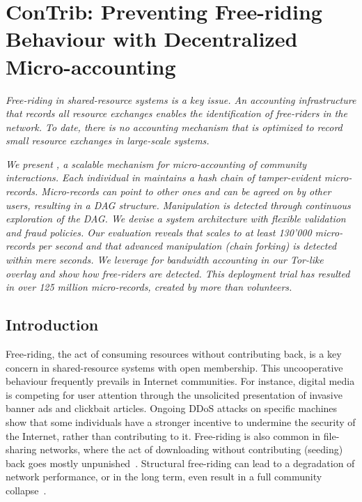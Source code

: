\chapter{ConTrib: Preventing Free-riding Behaviour with Decentralized Micro-accounting}
\label{chapter2}

\emph{Free-riding in shared-resource systems is a key issue.
An accounting infrastructure that records all resource exchanges enables the identification of free-riders in the network.
To date, there is no accounting mechanism that is optimized to record small resource exchanges in large-scale systems.}

\emph{We present \ModelName{}, a scalable mechanism for micro-accounting of community interactions.
Each individual in \ModelName{} maintains a hash chain of tamper-evident \emph{micro-records}.
Micro-records can point to other ones and can be agreed on by other users, resulting in a DAG structure.
Manipulation is detected through continuous exploration of the DAG.
We devise a system architecture with flexible validation and fraud policies.
Our evaluation reveals that \ModelName{} scales to at least 130'000 micro-records per second and that advanced manipulation (chain forking) is detected within mere seconds.
We leverage \ModelName{} for bandwidth accounting in our Tor-like overlay and show how free-riders are detected.
This deployment trial has resulted in over 125 million micro-records, created by more than \TrialUsers{} volunteers.}

\newpage

\section{Introduction}
Free-riding, the act of consuming resources without contributing back, is a key concern in shared-resource systems with open membership.
This uncooperative behaviour frequently prevails in Internet communities.
For instance, digital media is competing for user attention through the unsolicited presentation of invasive banner ads and clickbait articles.
Ongoing DDoS attacks on specific machines show that some individuals have a stronger incentive to undermine the security of the Internet, rather than contributing to it.
Free-riding is also common in file-sharing networks, where the act of downloading without contributing (seeding) back goes mostly unpunished~\cite{locher2006free}.
Structural free-riding can lead to a degradation of network performance, or in the long term, even result in a full community collapse~\cite{adar2000free}.

